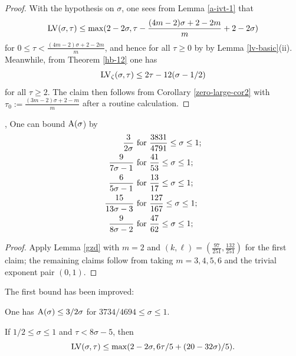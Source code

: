 \begin{proof} With the hypothesis on $\sigma$, one sees from Lemma \ref{a-ivt-1} that
$$ \mathrm{LV}(\sigma,\tau) \leq \max( 2 - 2 \sigma, \tau - \frac{(4m-2)\sigma + 2-2m}{m} + 2-2\sigma)$$
for $0 \leq \tau < \frac{(4m-2)\sigma + 2-2m}{m}$, and hence for all $\tau \geq 0$ by by Lemma \ref{lv-basic}(ii).  Meanwhile, from Theorem \ref{hb-12} one has
$$\mathrm{LV}_\zeta(\sigma,\tau) \leq 2\tau - 12 (\sigma-1/2)$$
for all $\tau \geq 2$.  The claim then follows from Corollary
\ref{zero-large-cor2} with $\tau_0 := \frac{(3m-2)\sigma+2-m}{m}$ after a routine calculation.
\end{proof}

\begin{corollary}\label{further_ivic_zero}\cite{ivic_exponent_pairs}, \cite[Theorem 11.4]{ivic} One can bound $\mathrm{A}(\sigma$) by
\begin{align*}
 \frac{3}{2\sigma} &\hbox{ for } \frac{3831}{4791} \leq \sigma \leq 1;\\
 \frac{9}{7\sigma-1} &\hbox{ for } \frac{41}{53} \leq \sigma \leq 1; \\
 \frac{6}{5\sigma-1} &\hbox{ for } \frac{13}{17} \leq \sigma \leq 1; \\
 \frac{15}{13\sigma-3} &\hbox{ for } \frac{127}{167} \leq \sigma \leq 1; \\
 \frac{9}{8\sigma-2} &\hbox{ for } \frac{47}{62} \leq \sigma \leq 1;
\end{align*}
\end{corollary}
\literature
{}
\derived
{}

\begin{proof} Apply Lemma \ref{gzd} with $m=2$ and $(k,\ell) = (\frac{97}{251}, \frac{132}{251})$ for the first claim; the remaining claims follow from taking $m=3, 4, 5, 6$ and the trivial exponent pair $(0, 1)$.
\end{proof}

The first bound has been improved:

\begin{theorem}\label{bourgain-zero-density-2000}\cite{bourgain_dirichlet_2000} One has $\mathrm{A}(\sigma) \leq 3/2\sigma$ for $3734/4694 \leq \sigma \leq 1$.
\end{theorem}
\literature
{}

\begin{lemma}\label{a-ivt}  If $1/2 \leq \sigma \leq 1$ and $\tau < 8\sigma-5$, then
    $$ \mathrm{LV}(\sigma,\tau) \leq \max( 2-2\sigma, 6\tau/5 + (20-32\sigma)/5 ).$$
\end{lemma}

